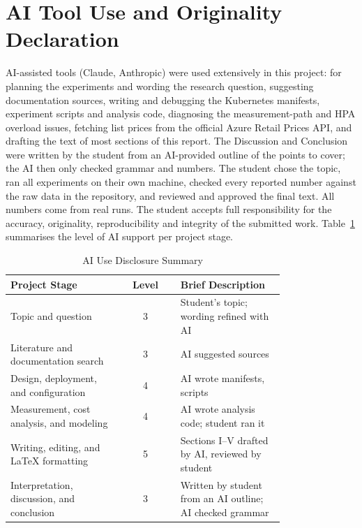 \documentclass[conference,a4paper]{IEEEtran}
\begin{document}
\section*{AI Tool Use and Originality Declaration}
\label{sec:ai_declaration}
AI-assisted tools (Claude, Anthropic) were used extensively in this project: for planning the experiments and wording the research question, suggesting documentation sources, writing and debugging the Kubernetes manifests, experiment scripts and analysis code, diagnosing the measurement-path and HPA overload issues, fetching list prices from the official Azure Retail Prices API, and drafting the text of most sections of this report. The Discussion and Conclusion were written by the student from an AI-provided outline of the points to cover; the AI then only checked grammar and numbers. The student chose the topic, ran all experiments on their own machine, checked every reported number against the raw data in the repository, and reviewed and approved the final text. All numbers come from real runs. The student accepts full responsibility for the accuracy, originality, reproducibility and integrity of the submitted work. Table~\ref{tab:ai_use} summarises the level of AI support per project stage.

\begin{table}[htbp]
	\caption{AI Use Disclosure Summary}
	\label{tab:ai_use}
	\centering
	\footnotesize
	\begin{tabular}{|>{\raggedright\arraybackslash}p{0.40\linewidth}|c|>{\raggedright\arraybackslash}p{0.38\linewidth}|}
		\hline
		\textbf{Project Stage} & \textbf{Level} & \textbf{Brief Description} \\
		\hline
		Topic and question & 3 & Student's topic; wording refined with AI \\
		\hline
		Literature and documentation search & 3 & AI suggested sources \\
		\hline
		Design, deployment, and configuration & 4 & AI wrote manifests, scripts \\
		\hline
		Measurement, cost analysis, and modeling & 4 & AI wrote analysis code; student ran it \\
		\hline
		Writing, editing, and LaTeX formatting & 5 & Sections I--V drafted by AI, reviewed by student \\
		\hline
		Interpretation, discussion, and conclusion & 3 & Written by student from an AI outline; AI checked grammar \\
		\hline
	\end{tabular}
\end{table}
\end{document}
